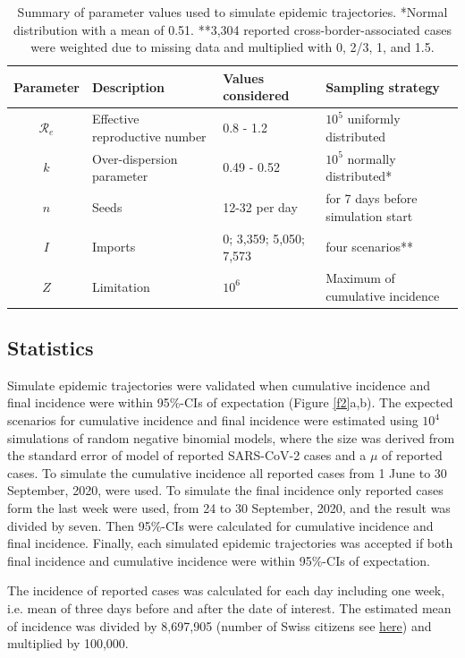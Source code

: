 \documentclass[10pt, a4paper, twoside]{article}
\begin{document}
\begin{multicols}{2}
\begin{table}
\begin{small} \caption{Summary of parameter values used to simulate epidemic trajectories. *Normal distribution with a mean of 0.51. **3,304 reported cross-border-associated cases were weighted due to missing data and multiplied with 0, 2/3, 1, and 1.5.\\}\end{small} 
\label{t1}
\begin{tabular}{clll}
	\hline
	Parameter & Description & Values considered & Sampling strategy\\
	\hline
	$\mathcal{R}_e$ & Effective reproductive number & 0.8 - 1.2 & $10^5$ uniformly distributed\\
	$k$ & Over-dispersion parameter & 0.49 - 0.52 & $10^5$ normally distributed*\\
	$n$ & Seeds & 12-32 per day & for 7 days before simulation start\\
	$I$ & Imports & 0; 3,359; 5,050; 7,573 & four scenarios**\\
	$Z$ & Limitation & $10^6$ & Maximum of cumulative incidence\\
	\hline
\end{tabular}
\end{table}

\subsection{Statistics}
Simulate epidemic trajectories were validated when cumulative incidence and final incidence were within 95\%-CIs of expectation (Figure \ref{f2}a,b).
The expected scenarios for cumulative incidence and final incidence were estimated using $10^4$ simulations of random negative binomial models, where the size was derived from the standard error of model of reported SARS-CoV-2 cases and a $\mu$ of reported cases.
To simulate the cumulative incidence all reported cases from 1 June to 30 September, 2020, were used.
To simulate the final incidence only reported cases form the last week were used, from 24 to 30 September, 2020, and the result was divided by seven.
Then 95\%-CIs were calculated for cumulative incidence and final incidence. 
Finally, each simulated epidemic trajectories was accepted if both final incidence and cumulative incidence were within 95\%-CIs of expectation.

The incidence of reported cases was calculated for each day including one week, i.e. mean of three days before and after the date of interest.
The estimated mean of incidence was divided by 8,697,905 (number of Swiss citizens see \href{https://www.worldometers.info/world-population/switzerland-population/}{here}) and multiplied by 100,000.


\end{multicols}
\end{document}
